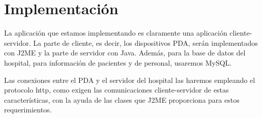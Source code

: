 \documentclass[12pt,a4paper,notitlepage,twoside]{report}
\begin{document}
\section{Implementaci\'on}
\begin{description}
La aplicaci\'on que estamos implementando es claramente una aplicaci\'on cliente-servidor. La parte de cliente, es decir, los dispositivos PDA, ser\'an implementados con J2ME y la parte de servidor con Java. Adem\'as, para la base de datos del hospital, para informaci\'on de pacientes y de personal, usaremos MySQL.
\end{description}
\begin{description} 
Las conexiones entre el PDA y el servidor del hospital las haremos empleando el protocolo http, como exigen las comunicaciones cliente-servidor de estas caracter\'isticas, con la ayuda de las clases que J2ME proporciona para estos requerimientos.
\end{description}
\end{document}
